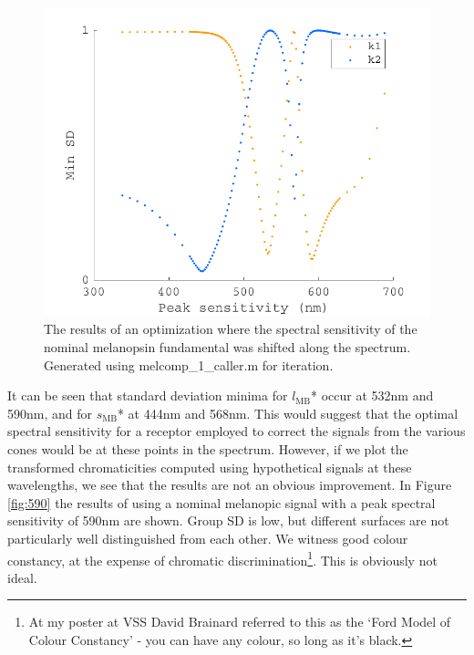 \begin{figure}[htbp]
    \includegraphics[max width=\textwidth]{figs/comp/transformToIllIndSpace/offsetrange1.pdf}
    \caption{The results of an optimization where the spectral sensitivity of the nominal melanopsin fundamental was shifted along the spectrum. Generated using melcomp\_1\_caller.m for iteration.}
    \label{fig:opt}
\end{figure} 

It can be seen that standard deviation minima for $l_{\text{MB}}$* occur at 532nm and 590nm, and for $s_{\text{MB}}$* at 444nm and 568nm. This would suggest that the optimal spectral sensitivity for a receptor employed to correct the signals from the various cones would be at these points in the spectrum. However, if we plot the transformed chromaticities computed using hypothetical signals at these wavelengths, we see that the results are not an obvious improvement. In Figure \ref{fig:590} the results of using a nominal melanopic signal with a peak spectral sensitivity of 590nm are shown. Group SD is low, but different surfaces are not particularly well distinguished from each other. We witness good colour constancy, at the expense of chromatic discrimination\footnote{At my poster at VSS David Brainard referred to this as the `Ford Model of Colour Constancy' - you can have any colour, so long as it's black.}. This is obviously not ideal.

